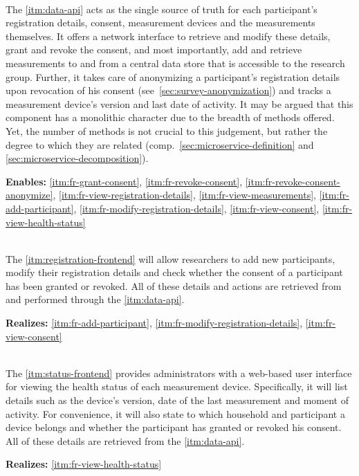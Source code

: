 \begin{description}[format={\storedescriptionlabel}]
  \item[Data \acs{API}\label{itm:data-api}]
  \hfill \\
  The \ref{itm:data-api} acts as the single source of truth for each participant's registration details, consent, measurement devices and the measurements themselves. It offers a network interface to retrieve and modify these details, grant and revoke the consent, and most importantly, add and retrieve measurements to and from a central data store that is accessible to the research group. Further, it takes care of anonymizing a participant's registration details upon revocation of his consent (see~\autoref{sec:survey-anonymization}) and tracks a measurement device's version and last date of activity. It may be argued that this component has a monolithic character due to the breadth of methods offered. Yet, the number of methods is not crucial to this judgement, but rather the degree to which they are related (comp.~\autoref{sec:microservice-definition} and \autoref{sec:microservice-decomposition}).

  \textbf{Enables:} \ref{itm:fr-grant-consent}, \ref{itm:fr-revoke-consent}, \ref{itm:fr-revoke-consent-anonymize}, \ref{itm:fr-view-registration-details}, \ref{itm:fr-view-measurements}, \ref{itm:fr-add-participant}, \ref{itm:fr-modify-registration-details}, \ref{itm:fr-view-consent}, \ref{itm:fr-view-health-status}

  \item[Registration Frontend\label{itm:registration-frontend}]
  \hfill \\
  The \ref{itm:registration-frontend} will allow researchers to add new participants, modify their registration details and check whether the consent of a participant has been granted or revoked. All of these details and actions are retrieved from and performed through the \ref{itm:data-api}.

  \textbf{Realizes:} \ref{itm:fr-add-participant}, \ref{itm:fr-modify-registration-details}, \ref{itm:fr-view-consent}

  \item[Status Frontend\label{itm:status-frontend}]
  \hfill \\
  The \ref{itm:status-frontend} provides administrators with a web-based user interface for viewing the health status of each measurement device. Specifically, it will list details such as the device's version, date of the last measurement and moment of activity. For convenience, it will also state to which household and participant a device belongs and whether the participant has granted or revoked his consent. All of these details are retrieved from the \ref{itm:data-api}.

  \textbf{Realizes:} \ref{itm:fr-view-health-status}
\end{description}
